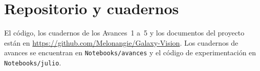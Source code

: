 \documentclass[letterpaper,11pt]{article}
\begin{document}
\section{Repositorio y cuadernos}
\label{anx:repo}
El código, los cuadernos de los Avances~1 a~5 y los documentos del proyecto están en \url{https://github.com/Melonangie/Galaxy-Vision}. Los cuadernos de avances se encuentran en \texttt{Notebooks/avances} y el código de experimentación en \texttt{Notebooks/julio}.
\end{document}
